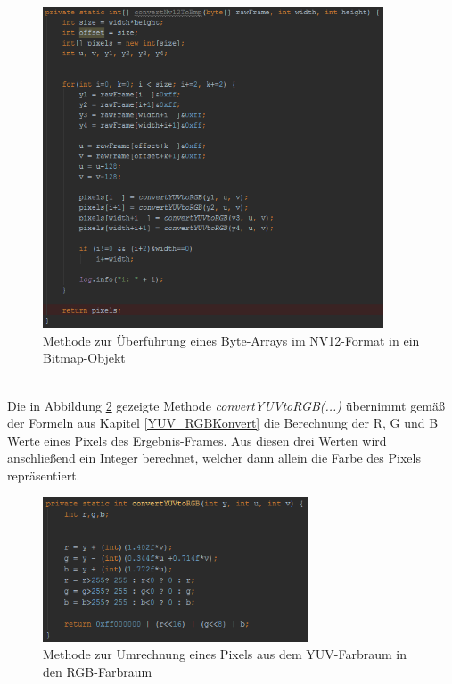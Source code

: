 \begin{figure}[h]
	\centering
	\includegraphics[width=0.9\textwidth]{Bilder/Bildverarbeitung/NV12_to_BMP.PNG}
	\caption{Methode zur Überführung eines Byte-Arrays im NV12-Format in ein Bitmap-Objekt}
	\label{fig:NV12_to_BMP}
\end{figure}

~\\
Die in Abbildung \ref{fig:YUV_to_RGB} gezeigte Methode \textit{convertYUVtoRGB(...)} übernimmt gemäß der Formeln aus Kapitel \ref{YUV_RGBKonvert} die Berechnung der R, G und B Werte eines Pixels des Ergebnis-Frames. Aus diesen drei Werten wird anschließend ein Integer berechnet, welcher dann allein die Farbe des Pixels repräsentiert.
\clearpage
\begin{figure}[h]
	\centering
	\includegraphics[width=0.7\textwidth]{Bilder/Bildverarbeitung/convert_1_Pixel.PNG}
	\caption{Methode zur Umrechnung eines Pixels aus dem YUV-Farbraum in den RGB-Farbraum}
	\label{fig:YUV_to_RGB}
\end{figure}

